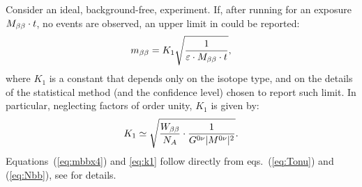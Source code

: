
Consider an ideal, background-free, experiment. If, after running for an exposure $M_{\beta\beta}\cdot t$, no events are observed, an upper limit in \mbb could be reported:
%
\begin{equation}
m_{\beta\beta} = K_{1} \sqrt{\frac{1}{\varepsilon\cdot M_{\beta\beta} \cdot t}}, \label{eq:mbbx4}
\end{equation}
%
where $K_{1}$ is a constant that depends only on the isotope type, and on the details of the statistical method (and the confidence level) chosen to report such limit. In particular, neglecting factors of order unity, $K_{1}$ is given by:
%
\begin{equation}
K_{1} \simeq \sqrt{\frac{W_{\beta\beta}}{N_A}\cdot \frac{1}{G^{0\nu}\lvert M^{0\nu}\rvert^2}}. \label{eq:k1}
\end{equation}
%
Equations~(\ref{eq:mbbx4}) and \ref{eq:k1} follow directly from eqs.~(\ref{eq:Tonu}) and (\ref{eq:Nbb}), see \cite{Gomez-Cadenas:2010zcc} for details.

